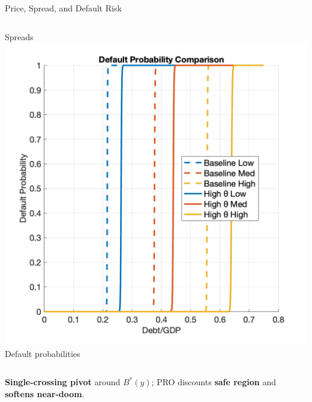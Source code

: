 \documentclass[aspectratio=169,11pt,professionalfonts]{beamer}
\newcommand{\1}{\mathbb{1}}
\begin{document}
\begin{frame}{Price, Spread, and Default Risk}
\begin{columns}[T,onlytextwidth]
    {\scriptsize Spreads}
    \includegraphics[width=\linewidth]{../../pro-default-model/results/default_prob_comparison.png}\\[0.3em]
    {\scriptsize Default probabilities}
  \end{columns}
  \vspace{0.3em}
  {\scriptsize \textbf{Single-crossing pivot} around $B^*(y)$; PRO discounts \textbf{safe region} and \textbf{softens near-doom}.}
\end{frame}
\end{document}
